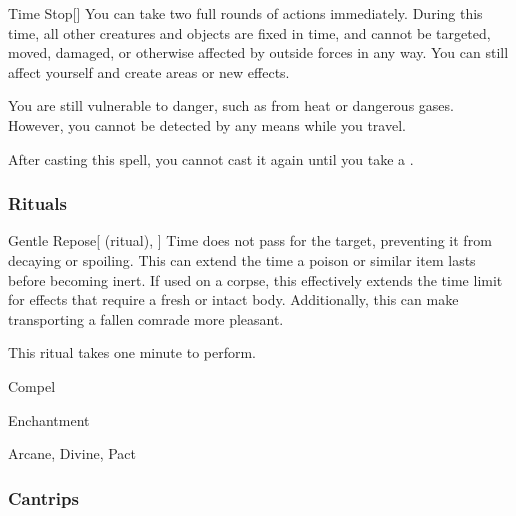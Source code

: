 \lowercase{\hypertarget{spell:Time Stop}{}}\label{spell:Time Stop}
\begin{freeability}[\nth{7}]{\hypertarget{spell:Time Stop}{Time Stop}}[]
You can take two full rounds of actions immediately.
During this time, all other creatures and objects are fixed in time, and cannot be targeted, moved, damaged, or otherwise affected by outside forces in any way.
You can still affect yourself and create areas or new effects.

You are still vulnerable to danger, such as from heat or dangerous gases.
However, you cannot be detected by any means while you travel.

After casting this spell, you cannot cast it again until you take a .
\end{freeability}
\vspace{0.25em}



\subsubsection{Rituals}


\lowercase{\hypertarget{spell:Gentle Repose}{}}\label{spell:Gentle Repose}
\begin{attuneability}[\nth{2}]{\hypertarget{spell:Gentle Repose}{Gentle Repose}}[ (ritual), ]
Time does not pass for the target, preventing it from decaying or spoiling.
This can extend the time a poison or similar item lasts before becoming inert.
If used on a corpse, this effectively extends the time limit for effects that require a fresh or intact body.
Additionally, this can make transporting a fallen comrade more pleasant.


This ritual takes one minute to perform.
\end{attuneability}
\vspace{0.25em}


\newpage
\begin{spellsection}{Compel}

\begin{spellheader}
\end{spellheader}


 Enchantment

 Arcane, Divine, Pact

\subsubsection{Cantrips}


\end{spellsection}


